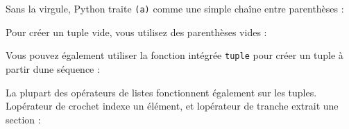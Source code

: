 Sans la virgule, Python traite
\texttt{(\textquotesingle{}a\textquotesingle{})} comme une simple chaîne
entre parenthèses :

\begin{Shaded}
\begin{Highlighting}[]
\OperatorTok{\textgreater{}\textgreater{}\textgreater{}}\OperatorTok{=}\NormalTok{ (}\NormalTok{)}
\OperatorTok{\textgreater{}\textgreater{}\textgreater{}} 
\OperatorTok{\textless{}} \OperatorTok{\textgreater{}}
\end{Highlighting}
\end{Shaded}

Pour créer un tuple vide, vous utilisez des parenthèses vides :

\begin{Shaded}
\begin{Highlighting}[]
\OperatorTok{\textgreater{}\textgreater{}\textgreater{}}\OperatorTok{=}\NormalTok{ ()}
\OperatorTok{\textgreater{}\textgreater{}\textgreater{}} 
\OperatorTok{\textless{}} \OperatorTok{\textgreater{}}
\end{Highlighting}
\end{Shaded}

Vous pouvez également utiliser la fonction intégrée \texttt{tuple} pour
créer un tuple à partir d\textquotesingle une séquence :

\begin{Shaded}
\begin{Highlighting}[]
\OperatorTok{\textgreater{}\textgreater{}\textgreater{}}\OperatorTok{=} \NormalTok{(}\NormalTok{)}
\OperatorTok{\textgreater{}\textgreater{}\textgreater{}}
\NormalTok{(}\NormalTok{, }\NormalTok{, }\NormalTok{, }\NormalTok{)}
\end{Highlighting}
\end{Shaded}

La plupart des opérateurs de listes fonctionnent également sur les
tuples. L\textquotesingle opérateur de crochet indexe un élément, et
l\textquotesingle opérateur de tranche extrait une section :

